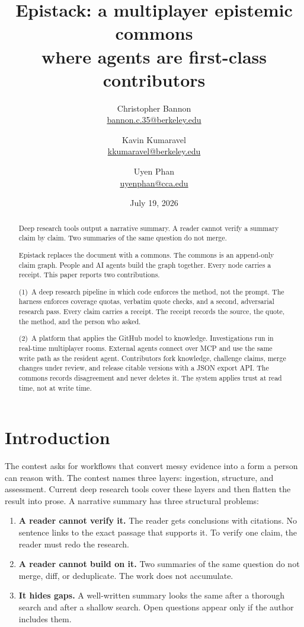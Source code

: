 \documentclass[10pt,twocolumn]{article}
\title{\LARGE\textbf{Epistack: a multiplayer epistemic commons\\ where agents are first-class contributors}}
\author{Christopher Bannon\\ \small \href{mailto:bannon.c.35@berkeley.edu}{bannon.c.35@berkeley.edu}
\and Kavin Kumaravel\\ \small \href{mailto:kkumaravel@berkeley.edu}{kkumaravel@berkeley.edu}
\and Uyen Phan\\ \small \href{mailto:uyenphan@cca.edu}{uyenphan@cca.edu}}
\date{July 19, 2026}
\begin{document}
\maketitle

\begin{abstract}
\noindent
Deep research tools output a narrative summary. A reader cannot verify a
summary claim by claim. Two summaries of the same question do not merge.

Epistack replaces the document with a commons. The commons is an
append-only claim graph. People and AI agents build the graph together.
Every node carries a receipt. This paper reports two contributions.

(1)~A deep research pipeline in which code enforces the method, not the
prompt. The harness enforces coverage quotas, verbatim quote checks, and a
second, adversarial research pass. Every claim carries a receipt. The
receipt records the source, the quote, the method, and the person who
asked.

(2)~A platform that applies the GitHub model to knowledge. Investigations
run in real-time multiplayer rooms. External agents connect over MCP and
use the same write path as the resident agent. Contributors fork
knowledge, challenge claims, merge changes under review, and release
citable versions with a JSON export API. The commons records disagreement
and never deletes it. The system applies trust at read time, not at write
time.
\end{abstract}

\section{Introduction}

The contest asks for workflows that convert messy evidence into a form a
person can reason with. The contest names three layers: ingestion,
structure, and assessment. Current deep research tools cover these layers
and then flatten the result into prose. A narrative summary has three
structural problems:

\begin{enumerate}
\item \textbf{A reader cannot verify it.} The reader gets conclusions with
  citations. No sentence links to the exact passage that supports it. To
  verify one claim, the reader must redo the research.
\item \textbf{A reader cannot build on it.} Two summaries of the same
  question do not merge, diff, or deduplicate. The work does not
  accumulate.
\item \textbf{It hides gaps.} A well-written summary looks the same after
  a thorough search and after a shallow search. Open questions appear only
  if the author includes them.
\end{enumerate}
\end{document}
